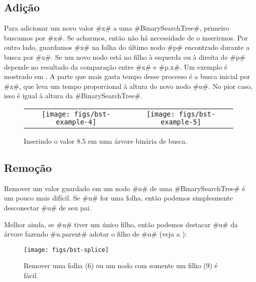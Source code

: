 \subsection{Adição}

Para adicionar um novo valor #x# a uma 
#BinarySearchTree#, primeiro buscamos por #x#. 
Se acharmos, então não há necessidade de o inserirmos. Por outro lado,
guardamos #x# na folha do último nodo #p# encontrado durante a busca
por #x#. Se um novo nodo está no filho à esquerda ou à direita de #p# depende
no resultado da comparação entre 
 #x# e #p.x#.
Um exemplo é mostrado em 
. A parte que mais gasta tempo desse processo é a busca inicial por #x#, que leva um tempo proporcional à altura do novo nodo #u#.
No pior caso, isso é igual à altura da #BinarySearchTree#.


\begin{figure}
  \begin{center}
    \begin{tabular}{cc}
    \texttt{[image: figs/bst-example-4]} &
    \texttt{[image: figs/bst-example-5]} 
    \end{tabular}
  \end{center}
  \caption{Inserindo o valor $8.5$ em uma árvore binária de busca.} 
\end{figure}


\subsection{Remoção}

Remover um valor guardado em um nodo #u# de uma
#BinarySearchTree# é um pouco mais difícil. 
Se #u# for uma folha, então podemos simplesmente desconectar #u# de seu pai.

Melhor ainda, se #u# tiver um único filho, então podemos destacar #u#
da árvore fazendo 
#u.parent# adotar o filho de #u# (veja a
):

\begin{figure}
  \begin{center}
    \texttt{[image: figs/bst-splice]}
  \end{center}
  \caption{Remover uma folha ($6$) ou um nodo com somente um filho ($9$) é fácil.}
\end{figure}

